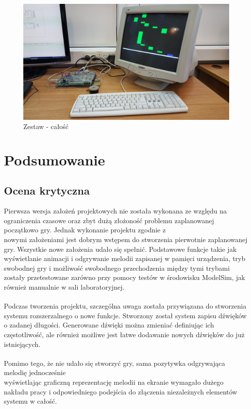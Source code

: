 \documentclass[a4paper]{report}
\begin{document}
		\begin{figure}[h!]
				\centering
				\includegraphics[width=1.0\textwidth]{zestaw_calosc.jpg}
				\caption{Zestaw - całość}
	\end{figure}	
		
	
\chapter{Podsumowanie}
	\section{Ocena krytyczna}
	Pierwsza wersja założeń projektowych nie została wykonana ze względu na ograniczenia czasowe oraz zbyt dużą złożoność problemu zaplanowanej początkowo gry. Jednak wykonanie projektu zgodnie z \\nowymi założeniami jest dobrym wstępem do stworzenia pierwotnie zaplanowanej gry. Wszystkie nowe założenia udało się spełnić. Podstawowe funkcje takie jak wyświetlanie animacji i odgrywanie melodii zapisanej w pamięci urządzenia, tryb swobodnej gry i możliwość swobodnego przechodzenia między tymi trybami zostały przetestowane zarówno przy pomocy testów w środowisku ModelSim, jak również manualnie w sali laboratoryjnej.
\\\\ Podczas tworzenia projektu, szczególna uwaga została przywiązana do stworzenia systemu rozszerzalnego o nowe funkcje. Stworzony został system zapisu dźwięków o zadanej długości. Generowane dźwięki można zmieniać definiując ich częstotliwość, ale również możliwe jest łatwe dodawanie nowych dźwięków do już istniejących.
\\\\Pomimo tego, że nie udało się stworzyć gry, sama pozytywka odgrywająca melodię jednocześnie \\wyświetlając graficzną reprezentację melodii na ekranie wymagało dużego nakładu pracy i odpowiedniego podejścia do złączenia niezależnych elementów systemu w całość.
\end{document}
